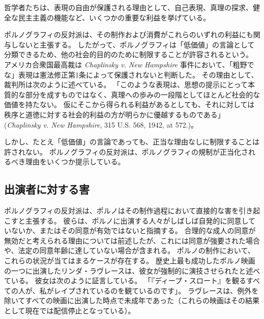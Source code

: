 \documentclass[paper=a4,book,openany]{jlreq}
\begin{document}
哲学者たちは、表現の自由が保護される理由として、自己表現、真理の探求、健全な民主主義の機能など、いくつかの重要な利益を挙げている\citep{scanlon11:_why_not_base_free_speec_auton_democ}。

ポルノグラフィの反対派は、その制作および消費がこれらのいずれの利益にも関与しないと主張する。
したがって、ポルノグラフィは「低価値」の言論として分類できるため、他の社会的目的のために制限することが許容されるという。
アメリカ合衆国最高裁は \emph{Chaplinsky v. New Hampshire} 事件において、「粗野でな」表現は憲法修正第1条によって保護されないと判断した。
その理由として、裁判所は次のように述べている。
「このような表現は、思想の提示にとって本質的な部分を成すものではなく、真理への歩みの一段階としてほとんど社会的な価値を持たない。
仮にそこから得られる利益があるとしても、それに対しては秩序と道徳に対する社会的利益の方が明らかに優越するものである」(\emph{Chaplinsky v. New Hampshire}, 315 U.S. 568, 1942, at 572.)。

しかし、たとえ「低価値」の言論であっても、正当な理由なしに制限することは許されない。
ポルノグラフィの反対派は、ポルノグラフィの規制が正当化されるべき理由をいくつか提示している。

\subsection{出演者に対する害}

ポルノグラフィの反対派は、ポルノはその制作過程において直接的な害を引き起こすと主張する。
彼らは、ポルノに出演する人々がしばしば自発的に同意していないか、またはその同意が有効ではないと指摘する。
合理的な成人の同意が無効だと考えられる理由については前述したが、これには同意が強要された場合や、法定の同意年齢に達していない場合が含まれる。
ポルノの制作において、これらの状況が当てはまるケースが存在する。
歴史上最も成功したポルノ映画の一つに出演したリンダ・ラヴレースは、彼女が強制的に演技させられたと述べている。
彼女は次のように証言している。
「『ディープ・スロート』を観るすべての人が、私がレイプされているのを観ているのです」\citep{bailey05:_insid_deep_throat}。
ラヴレースは、例外を除いてすべての映画に出演した時点で未成年であった（これらの映画はその結果として現在では配信停止となっている）。
\end{document}
